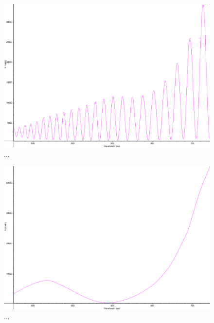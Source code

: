 \documentclass[a4paper]{article}
\begin{document}
\FloatBarrier
\begin{figure}[h!]
	\centering
	\includegraphics[width=\linewidth]{data/spektra_180_kristall3_140_inv}
	\caption{...}
	\label{fig:}
\end{figure}
\FloatBarrier

\FloatBarrier
\begin{figure}[h!]
	\centering
	\includegraphics[width=\linewidth]{data/spektra_aktiv1_inv}
	\caption{...}
	\label{fig:}
\end{figure}
\FloatBarrier
\end{document}
